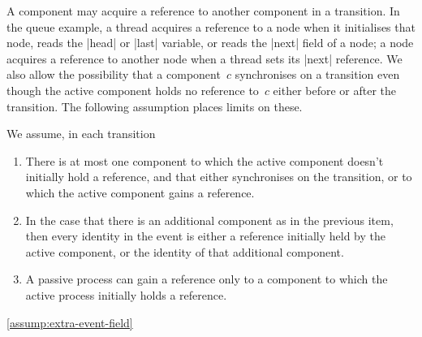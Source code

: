 A component may acquire a reference to another component in a transition.  In
the queue example, a thread acquires a reference to a node when it initialises
that node, reads the |head| or |last| variable, or reads the |next| field of a
node; a node acquires a reference to another node when a thread sets its
|next| reference.  We also allow the possibility that a component~$c$
synchronises on a transition even though the active component holds no
reference to~$c$ either before or after the transition.  The following
assumption places limits on these. 
%
\begin{assumption}
\label{assump:2}
We assume, in each transition
\begin{enumerate}
\item\label{assump:max-one-extra-component} There is at most one component to
  which the active component doesn't initially hold a reference, and that
  either synchronises on the transition, or to which the active component
  gains a reference.

\item\label{assump:extra-event-field} In the case that there is an additional
  component as in the previous item, then every identity in the event is
  either a reference initially held by the active component, or the identity
  of that additional component.

\item\label{assump:secondary-cpts-new-refs} A passive process can gain a
  reference only to a component to which the active process initially holds a
  reference.
\end{enumerate}
\end{assumption}

 \ref{assump:extra-event-field}



%

